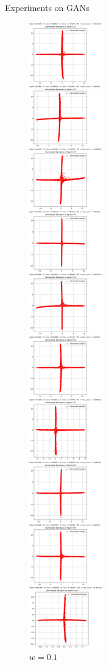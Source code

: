 \documentclass[final]{beamer}
\newlength{\colwidth}
\begin{document}
\begin{frame}[t]
\begin{columns}[t]
\begin{column}{\colwidth}
\begin{block}{Experiments on GANs}
\begin{figure}
\begin{minipage}{0.19\textwidth}
    \caption{$w=0.1$}
    \end{minipage}
    \begin{minipage}{0.19\textwidth}
    \centering
    \includegraphics[width=1\linewidth]{gan_cross/Jietu20250101-003406@2x.png}

\end{minipage}
\end{figure}
\end{block}
\end{column}
\end{columns}
\end{frame}
\end{document}
